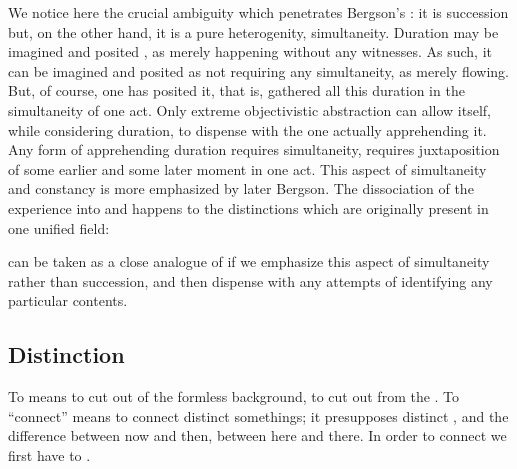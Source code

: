 {  We notice here the crucial ambiguity which penetrates Bergson's
  : it is succession but, on the other hand, it is a pure
  heterogenity, simultaneity.  
  Duration may be imagined and posited , as merely happening
   without any witnesses. As such, it can be imagined and posited
  as not requiring any simultaneity, as merely flowing. But, of course, one has
  posited it, that is, gathered all this duration in the simultaneity of one
  act. Only extreme objectivistic abstraction can allow itself, while
  considering duration, to dispense with the one actually apprehending it.  Any
  form of apprehending duration requires simultaneity, requires juxtaposition of
  some earlier and some later moment in one act.  This aspect of simultaneity
  and constancy is more emphasized by later Bergson.   The dissociation of the experience into
   and  happens to the distinctions which are originally
  present in one unified field: 
  
   can be taken as a close analogue of  if we emphasize
  this aspect of simultaneity rather than succession, and then dispense with any
  attempts of identifying any particular contents. \label{ftnt:duree}
}


\subsection{Distinction}
\pa\label{th:cut} To  means to {cut} out of the formless
background, to cut out from the . To ``connect'' means to connect
distinct somethings; it presupposes distinct , and the difference
between {now} and {then}, between {here} and {there}.  In order to connect we
first have to .

